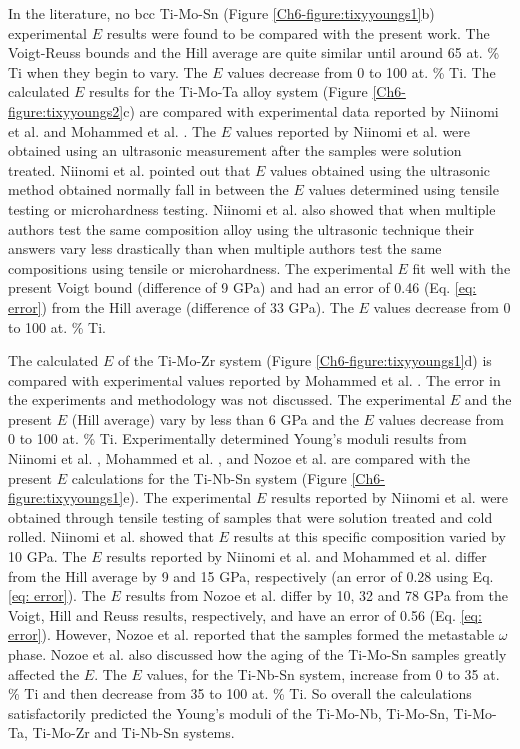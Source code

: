 In the literature, no bcc Ti-Mo-Sn (Figure \ref{Ch6-figure:tixyyoungs1}b) experimental $E$ results were found to be compared with the present work. The Voigt-Reuss bounds and the Hill average are quite similar until around 65 at. \% Ti when they begin to vary. The $E$ values decrease from 0 to 100 at. \% Ti. The calculated $E$ results for the Ti-Mo-Ta alloy system (Figure \ref{Ch6-figure:tixyyoungs2}c) are compared with experimental data reported by Niinomi et al. \cite{Niinomi2012} and Mohammed et al. \cite{Mohammed2014}. The $E$ values reported by Niinomi et al. \cite{Niinomi2012} were obtained using an ultrasonic measurement after the samples were solution treated. Niinomi et al. \cite{Niinomi2012} pointed out that $E$ values obtained using the ultrasonic method obtained normally fall in between the $E$ values determined using tensile testing or microhardness testing. Niinomi et al. \cite{Niinomi2012} also showed that when multiple authors test the same composition alloy using the ultrasonic technique their answers vary less drastically than when multiple authors test the same compositions using tensile or microhardness. The experimental $E$ fit well with the present Voigt bound (difference of 9 GPa) and had an error of 0.46 (Eq. \ref{eq: error}) from the Hill average (difference of 33 GPa). The $E$ values decrease from 0 to 100 at. \% Ti. 

The calculated $E$ of the Ti-Mo-Zr system (Figure \ref{Ch6-figure:tixyyoungs1}d) is compared with experimental values reported by Mohammed et al. \cite{Mohammed2014}. The error in the experiments and methodology was not discussed. The experimental $E$ \cite{Mohammed2014} and the present $E$ (Hill average) vary by less than 6 GPa and the $E$ values decrease from 0 to 100 at. \% Ti. Experimentally determined Young's moduli results from Niinomi et al. \cite{Niinomi2012}, Mohammed et al. \cite{Mohammed2014}, and Nozoe et al. \cite{Nozoe2007} are compared with the present $E$ calculations for the Ti-Nb-Sn system (Figure \ref{Ch6-figure:tixyyoungs1}e). The experimental $E$ results reported by Niinomi et al. \cite{Niinomi2012} were obtained through tensile testing of samples that were solution treated and cold rolled. Niinomi et al. \cite{Niinomi2012} showed that $E$ results at this specific composition varied by 10 GPa. The $E$ results reported by Niinomi et al. \cite{Niinomi2012} and Mohammed et al. \cite{Mohammed2014} differ from the Hill average by 9 and 15 GPa, respectively (an error of 0.28 using Eq. \ref{eq: error}). The $E$ results from Nozoe et al. \cite{Nozoe2007} differ by 10, 32 and 78 GPa from the Voigt, Hill and Reuss results, respectively, and have an error of 0.56 (Eq. \ref{eq: error}). However, Nozoe et al. reported that the samples formed the metastable $\omega$ phase. Nozoe et al. \cite{Nozoe2007} also discussed how the aging of the Ti-Mo-Sn samples greatly affected the $E$. The $E$ values, for the Ti-Nb-Sn system, increase from 0 to 35 at. \% Ti and then decrease from 35 to 100 at. \% Ti. So overall the calculations satisfactorily predicted the Young's moduli of the Ti-Mo-Nb, Ti-Mo-Sn, Ti-Mo-Ta, Ti-Mo-Zr and Ti-Nb-Sn systems. 

